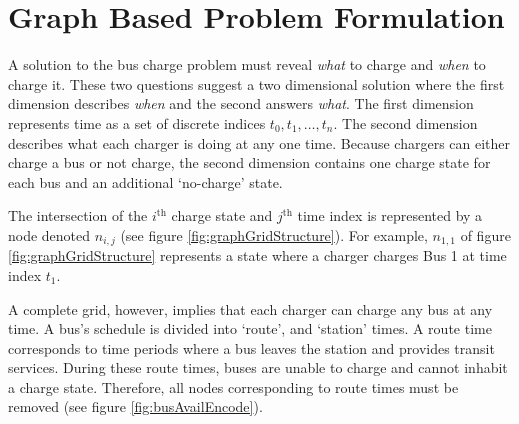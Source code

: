 \section{Graph Based Problem Formulation}
A solution to the bus charge problem must reveal \textit{what} to charge and \textit{when} to charge it. These two questions suggest a two dimensional solution where the first dimension describes \textit{when} and the second answers \textit{what}. The first dimension represents time as a set of discrete indices $t_0, t_1, \hdots, t_n$. The second dimension describes what each charger is doing at any one time. Because chargers can either charge a bus or not charge, the second dimension  contains one charge state for each bus and an additional `no-charge' state. 
\par The intersection of the $i^{\text{th}}$ charge state and $j^{\text{th}}$ time index is represented by a node denoted $n_{i,j}$ (see figure \ref{fig:graphGridStructure}). For example, $n_{1,1}$ of figure \ref{fig:graphGridStructure} represents a state where a charger charges Bus 1 at time index $t_1$. 
\par A complete grid, however, implies that each charger can charge any bus at any time.  A bus's schedule is divided into `route', and `station' times. A route time corresponds to time periods where a bus leaves the station and provides transit services. During these route times, buses are unable to charge and cannot inhabit a charge state. Therefore, all nodes corresponding to route times must be removed (see figure \ref{fig:busAvailEncode}). 

